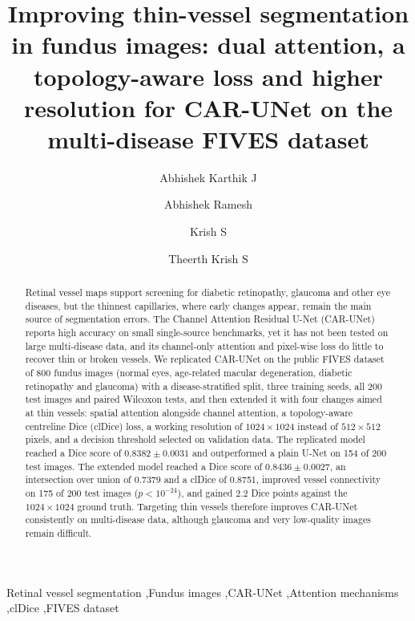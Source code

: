 \documentclass[a4paper,fleqn]{cas-sc}
\begin{document}
\let\WriteBookmarks\relax
\def\floatpagepagefraction{1}
\def\textpagefraction{.001}


\title [mode = title]{Improving thin-vessel segmentation in fundus images: dual attention, a topology-aware loss and higher resolution for CAR-UNet on the multi-disease FIVES dataset}

\author{Abhishek Karthik J}
\author{Abhishek Ramesh}
\author{Krish S}
\author{Theerth Krish S}


\begin{abstract}
Retinal vessel maps support screening for diabetic retinopathy, glaucoma and other eye diseases, but the thinnest capillaries, where early changes appear, remain the main source of segmentation errors. The Channel Attention Residual U-Net (CAR-UNet) reports high accuracy on small single-source benchmarks, yet it has not been tested on large multi-disease data, and its channel-only attention and pixel-wise loss do little to recover thin or broken vessels. We replicated CAR-UNet on the public FIVES dataset of 800 fundus images (normal eyes, age-related macular degeneration, diabetic retinopathy and glaucoma) with a disease-stratified split, three training seeds, all 200 test images and paired Wilcoxon tests, and then extended it with four changes aimed at thin vessels: spatial attention alongside channel attention, a topology-aware centreline Dice (clDice) loss, a working resolution of $1024 \times 1024$ instead of $512 \times 512$ pixels, and a decision threshold selected on validation data. The replicated model reached a Dice score of $0.8382 \pm 0.0031$ and outperformed a plain U-Net on 154 of 200 test images. The extended model reached a Dice score of $0.8436 \pm 0.0027$, an intersection over union of 0.7379 and a clDice of 0.8751, improved vessel connectivity on 175 of 200 test images ($p < 10^{-24}$), and gained 2.2 Dice points against the $1024 \times 1024$ ground truth. Targeting thin vessels therefore improves CAR-UNet consistently on multi-disease data, although glaucoma and very low-quality images remain difficult.
\end{abstract}

\begin{keywords}
Retinal vessel segmentation \sep Fundus images \sep CAR-UNet \sep Attention mechanisms \sep clDice \sep FIVES dataset
\end{keywords}
\end{document}
